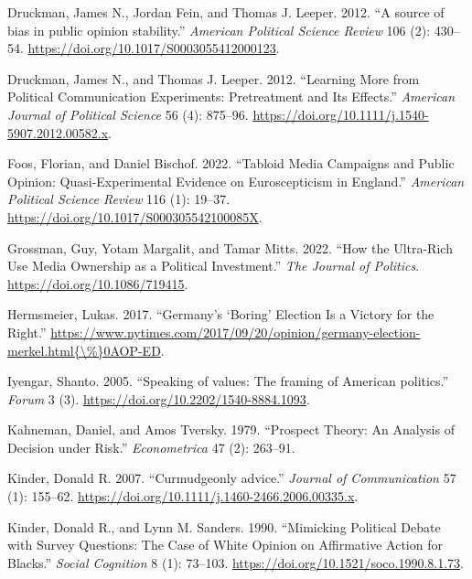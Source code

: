 \documentclass[
  12pt,
]{article}
\newlength{\cslhangindent}
\newlength{\cslentryspacingunit} %
\newenvironment{CSLReferences}[2] %
 {%
  \setlength{\parindent}{0pt}
  \ifodd #1
  \let\oldpar\par
  \def\par{\hangindent=\cslhangindent\oldpar}
  \fi
  \setlength{\parskip}{#2\cslentryspacingunit}
 }%
 {}
\begin{document}
\begin{CSLReferences}{1}{0}
\leavevmode{}%
Druckman, James N., Jordan Fein, and Thomas J. Leeper. 2012. {``{A source of bias in public opinion stability}.''} \emph{American Political Science Review} 106 (2): 430--54. \url{https://doi.org/10.1017/S0003055412000123}.

\leavevmode{}%
Druckman, James N., and Thomas J. Leeper. 2012. {``{Learning More from Political Communication Experiments: Pretreatment and Its Effects}.''} \emph{American Journal of Political Science} 56 (4): 875--96. \url{https://doi.org/10.1111/j.1540-5907.2012.00582.x}.

\leavevmode{}%
Foos, Florian, and Daniel Bischof. 2022. {``{Tabloid Media Campaigns and Public Opinion: Quasi-Experimental Evidence on Euroscepticism in England}.''} \emph{American Political Science Review} 116 (1): 19--37. \url{https://doi.org/10.1017/S000305542100085X}.

\leavevmode{}%
Grossman, Guy, Yotam Margalit, and Tamar Mitts. 2022. {``{How the Ultra-Rich Use Media Ownership as a Political Investment}.''} \emph{The Journal of Politics}. \url{https://doi.org/10.1086/719415}.

\leavevmode{}%
Hermsmeier, Lukas. 2017. {``{Germany's `Boring' Election Is a Victory for the Right}.''} \href{https://www.nytimes.com/2017/09/20/opinion/germany-election-\%20merkel.html\%7B/\%\%7D0AOP-ED}{https://www.nytimes.com/2017/09/20/opinion/germany-election- merkel.html\{\textbackslash\%\}0AOP-ED}.

\leavevmode{}%
Iyengar, Shanto. 2005. {``{Speaking of values: The framing of American politics}.''} \emph{Forum} 3 (3). \url{https://doi.org/10.2202/1540-8884.1093}.

\leavevmode{}%
Kahneman, Daniel, and Amos Tversky. 1979. {``{Prospect Theory: An Analysis of Decision under Risk}.''} \emph{Econometrica} 47 (2): 263--91.

\leavevmode{}%
Kinder, Donald R. 2007. {``{Curmudgeonly advice}.''} \emph{Journal of Communication} 57 (1): 155--62. \url{https://doi.org/10.1111/j.1460-2466.2006.00335.x}.

\leavevmode{}%
Kinder, Donald R., and Lynn M. Sanders. 1990. {``{Mimicking Political Debate with Survey Questions: The Case of White Opinion on Affirmative Action for Blacks}.''} \emph{Social Cognition} 8 (1): 73--103. \url{https://doi.org/10.1521/soco.1990.8.1.73}.


\end{CSLReferences}
\end{document}
